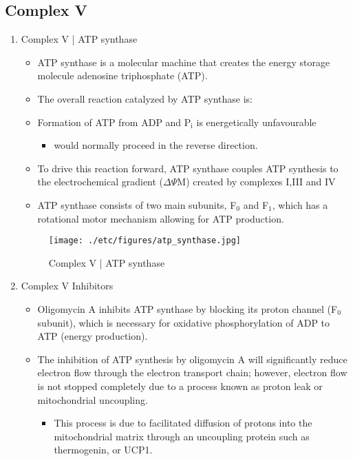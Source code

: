\documentclass{scrartcl}
\begin{document}
\subsection{Complex V}
\label{sec:org5566c5a}
\begin{enumerate}
\item Complex V | ATP synthase
\label{sec:orgb526f23}

\begin{itemize}
\item ATP synthase is a molecular machine that creates the energy storage
molecule adenosine triphosphate (ATP).

\item The overall reaction catalyzed by ATP synthase is:
\end{itemize}

{\small{}}

\begin{itemize}
\item Formation of ATP from ADP and P\(_{\text{i}}\) is energetically unfavourable
\begin{itemize}
\item would normally proceed in the reverse direction.
\end{itemize}

\item To drive this reaction forward, ATP synthase couples ATP synthesis
to the electrochemical gradient (\(\Delta \Psi\)M) created by complexes
I,III and IV

\item ATP synthase consists of two main subunits, F\(_{\text{0}}\) and F\(_{\text{1}}\), which has a
rotational motor mechanism allowing for ATP production.
\end{itemize}

\begin{figure}[htbp]
\centering
\texttt{[image: ./etc/figures/atp\_synthase.jpg]}
\caption{\label{fig:org3ebe084}
Complex V | ATP synthase}
\end{figure}

\item Complex V Inhibitors
\label{sec:org9d97e74}
\begin{itemize}
\item Oligomycin A inhibits ATP synthase by blocking its proton channel
(F\(_{\text{0}}\) subunit), which is necessary for oxidative phosphorylation of
ADP to ATP (energy production).
\item The inhibition of ATP synthesis by oligomycin A will significantly
reduce electron flow through the electron transport chain; however,
electron flow is not stopped completely due to a process known as
proton leak or mitochondrial uncoupling.
\begin{itemize}
\item This process is due to facilitated diffusion of protons into the
mitochondrial matrix through an uncoupling protein such as
thermogenin, or UCP1.
\end{itemize}


\end{itemize}
\end{enumerate}
\end{document}
